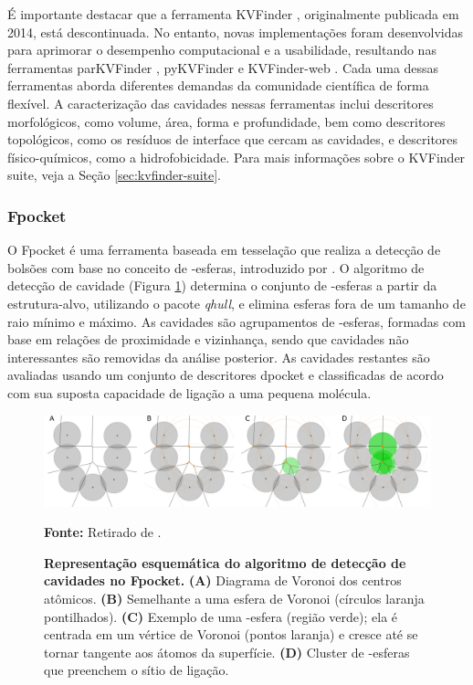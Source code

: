 \documentclass[Portugues]{phdquali}
\begin{document}
É importante destacar que a ferramenta KVFinder \cite{oliveira2014}, originalmente publicada em 2014, está descontinuada. No entanto, novas implementações foram desenvolvidas para aprimorar o desempenho computacional e a usabilidade, resultando nas ferramentas parKVFinder \cite{guerra2020}, pyKVFinder \cite{guerra2021} e KVFinder-web \cite{guerra2023A}. Cada uma dessas ferramentas aborda diferentes demandas da comunidade científica de forma flexível. A caracterização das cavidades nessas ferramentas inclui descritores morfológicos, como volume, área, forma e profundidade, bem como descritores topológicos, como os resíduos de interface que cercam as cavidades, e descritores físico-químicos, como a hidrofobicidade. Para mais informações sobre o KVFinder suite, veja a Seção \ref{sec:kvfinder-suite}.

\subsubsection{Fpocket}

O Fpocket \cite{fpocket} é uma ferramenta baseada em tesselação que realiza a detecção de bolsões com base no conceito de \textalpha-esferas, introduzido por \cite{liang1998}. O algoritmo de detecção de cavidade (Figura \ref{fig:fpocket-schema}) determina o conjunto de \textalpha-esferas a partir da estrutura-alvo, utilizando o pacote \textit{qhull}, e elimina esferas fora de um tamanho de raio mínimo e máximo. As cavidades são agrupamentos de \textalpha-esferas, formadas com base em relações de proximidade e vizinhança, sendo que cavidades não interessantes são removidas da análise posterior. As cavidades restantes são avaliadas usando um conjunto de descritores dpocket \cite{fpocket} e classificadas de acordo com sua suposta capacidade de ligação a uma pequena molécula.

\begin{figure}[ht]
  \centerline{\includegraphics[scale=0.24]{images/fpocket-schema.png}}
  \centerline{\scriptsize{\textbf{Fonte:} Retirado de \cite{guerra2023B}.}}
  \caption[Representação esquemática do algoritmo de detecção de cavidades no Fpocket]{\textbf{Representação esquemática do algoritmo de detecção de cavidades no Fpocket.} \textbf{(A)} Diagrama de Voronoi dos centros atômicos. \textbf{(B)} Semelhante a uma esfera de Voronoi (círculos laranja pontilhados). \textbf{(C)} Exemplo de uma \textalpha-esfera (região verde); ela é centrada em um vértice de Voronoi (pontos laranja) e cresce até se tornar tangente aos átomos da superfície. \textbf{(D)} Cluster de \textalpha-esferas que preenchem o sítio de ligação.}
  \label{fig:fpocket-schema}
\end{figure}
\end{document}
